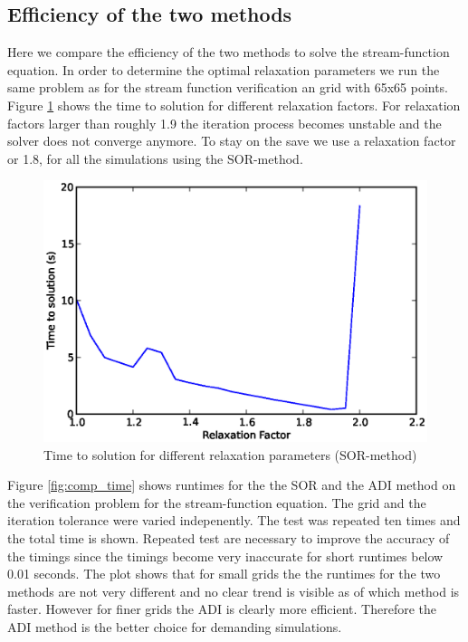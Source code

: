 \subsection{Efficiency of the two methods}
Here we compare the efficiency of the two methods to solve the stream-function equation. In order to determine the optimal relaxation parameters we run the same problem as for the stream function verification an grid with 65x65 points. Figure \ref{fig:relax_sor} shows the time to solution for different relaxation factors. For relaxation factors larger than roughly 1.9 the iteration process becomes unstable and the solver does not converge anymore. To stay on the save we use a relaxation factor or 1.8, for all the simulations using the SOR-method.
%
\begin{figure}[H]
\centering
\includegraphics[scale=0.8]{"figs/relax_factor"}
\caption{Time to solution for different relaxation parameters (SOR-method)}
\label{fig:relax_sor}
\end{figure}
%
Figure \ref{fig:comp_time} shows runtimes for the the SOR and the ADI method on the verification problem for the stream-function equation. The grid and the iteration tolerance were varied indepenently. The test was repeated ten times and the total time is shown. Repeated test are necessary to improve the accuracy of the timings since the timings become very inaccurate for short runtimes below 0.01 seconds. The plot shows that for small grids the the runtimes for the two methods are not very different and no clear trend is visible as of which method is faster. However for finer grids the ADI is clearly more efficient. Therefore the ADI method is the better choice for demanding simulations.
%
